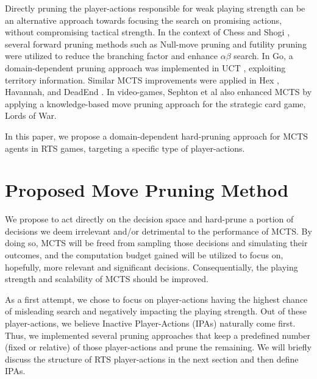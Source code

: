 \documentclass[conference]{IEEEtran}
\begin{document}
Directly pruning the player-actions responsible for weak playing strength can be an alternative approach towards focusing the search on promising actions, without compromising tactical strength. In the context of Chess \cite{heinz_adaptive_1999} and Shogi \cite{hoki_efficiency_2012}, several forward pruning methods such as Null-move pruning and futility pruning were utilized to reduce the branching factor and enhance $\alpha\beta$ search. In Go, a domain-dependent pruning approach was implemented in UCT \cite{huang_pruning_2010-1}, exploiting territory information. Similar MCTS improvements were applied in Hex \cite{arneson_monte_2010}, Havannah, \cite{dugueperoux_pruning_2016} and DeadEnd \cite{he_game_2008-1}. In video-games, Sephton et al \cite{sephton_heuristic_2014} also enhanced MCTS by applying a knowledge-based move pruning approach for the strategic card game, Lords of War.

In this paper, we propose a domain-dependent hard-pruning approach for MCTS agents in RTS games, targeting a specific type of player-actions.



\section{Proposed Move Pruning Method}
\label{sec:proposed_method}

We propose to act directly on the decision space and hard-prune a portion of decisions we deem irrelevant and/or detrimental to the performance of MCTS. By doing so, MCTS will be freed from sampling those decisions and simulating their outcomes, and the computation budget gained will be utilized to focus on, hopefully, more relevant and significant decisions. Consequentially, the playing strength and scalability of MCTS should be improved.

As a first attempt, we chose to focus on player-actions having the highest chance of misleading search and negatively impacting the playing strength. Out of these player-actions, we believe Inactive Player-Actions (IPAs) naturally come first. Thus, we implemented several pruning approaches that keep a predefined number (fixed or relative) of those player-actions and prune the remaining. We will briefly discuss the structure of RTS player-actions in the next section and then define IPAs.

\end{document}

